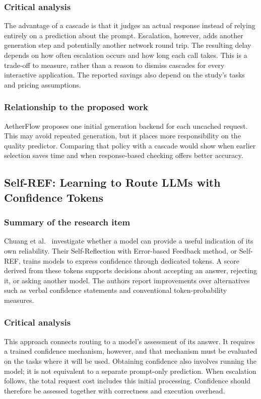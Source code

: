 \subsubsection{Critical analysis}
The advantage of a cascade is that it judges an actual response instead of relying entirely on a prediction about the prompt. Escalation, however, adds another generation step and potentially another network round trip. The resulting delay depends on how often escalation occurs and how long each call takes. This is a trade-off to measure, rather than a reason to dismiss cascades for every interactive application. The reported savings also depend on the study's tasks and pricing assumptions.

\subsubsection{Relationship to the proposed work}
AetherFlow proposes one initial generation backend for each uncached request. This may avoid repeated generation, but it places more responsibility on the quality predictor. Comparing that policy with a cascade would show when earlier selection saves time and when response-based checking offers better accuracy.

\subsection{Self-REF: Learning to Route LLMs with Confidence Tokens}
\subsubsection{Summary of the research item}
Chuang et al.\ \cite{ref:SelfREF} investigate whether a model can provide a useful indication of its own reliability. Their Self-Reflection with Error-based Feedback method, or Self-REF, trains models to express confidence through dedicated tokens. A score derived from these tokens supports decisions about accepting an answer, rejecting it, or asking another model. The authors report improvements over alternatives such as verbal confidence statements and conventional token-probability measures.

\subsubsection{Critical analysis}
This approach connects routing to a model's assessment of its answer. It requires a trained confidence mechanism, however, and that mechanism must be evaluated on the tasks where it will be used. Obtaining confidence also involves running the model; it is not equivalent to a separate prompt-only prediction. When escalation follows, the total request cost includes this initial processing. Confidence should therefore be assessed together with correctness and execution overhead.


